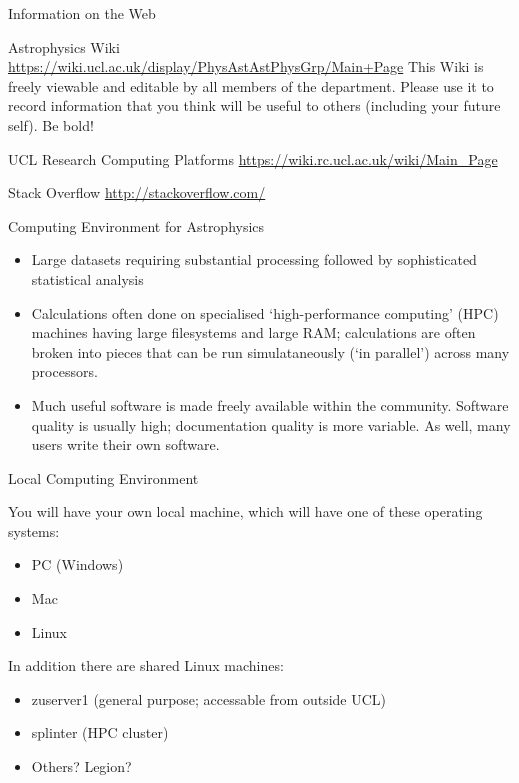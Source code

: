 \documentclass{beamer}
\begin{document}
\begin{frame}{Information on the Web}
  \begin{block}{Astrophysics Wiki}
    \url{https://wiki.ucl.ac.uk/display/PhysAstAstPhysGrp/Main+Page}
    This Wiki is freely viewable and editable by all members of the department. Please use it to record information that you think will be useful to others (including your future self). Be bold!
  \end{block}

  \begin{block}{UCL Research Computing Platforms}
    \url{https://wiki.rc.ucl.ac.uk/wiki/Main_Page}
  \end{block}
  
  \begin{block}{Stack Overflow}
    \url{http://stackoverflow.com/}
  \end{block}
  
\end{frame}



\begin{frame}{Computing Environment for Astrophysics}
  \begin{itemize}
  \item Large datasets requiring substantial processing followed by sophisticated statistical analysis
  \item Calculations often done on specialised `high-performance computing' (HPC) machines having large filesystems and large RAM; calculations are often broken into pieces that can be run simulataneously (`in parallel') across many processors.
  \item Much useful software is made freely available within the community. Software quality is usually high; documentation quality is more variable. As well, many users write their own software.
  \end{itemize}
\end{frame}

\begin{frame}{Local Computing Environment}
  \begin{block}{You will have your own local machine, which will have one of these operating systems:}
    \begin{itemize}
    \item PC (Windows)
    \item Mac
    \item Linux
    \end{itemize}
  \end{block}
  \begin{block}{In addition there are shared Linux machines:}
    \begin{itemize}
    \item zuserver1 (general purpose; accessable from outside UCL)
    \item splinter (HPC cluster)
    \item Others? Legion?
    \end{itemize}
  \end{block}
\end{frame}
\end{document}
